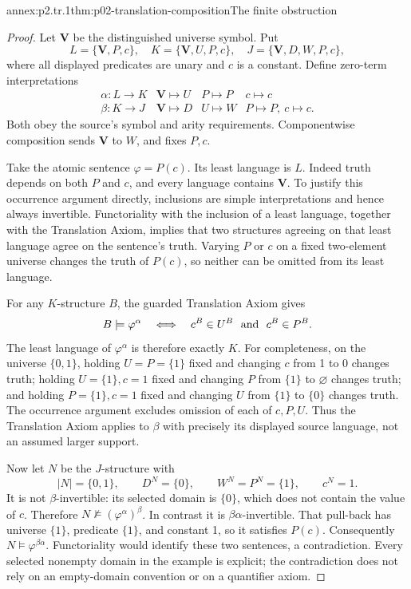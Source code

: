 \begin{annexitem}{annex:p2.tr.1}{thm:p02-translation-composition}{The finite obstruction}
\begin{proof}
Let \(\mathbf V\) be the distinguished universe symbol. Put
\[
 L=\{\mathbf V,P,c\},\quad
 K=\{\mathbf V,U,P,c\},\quad
 J=\{\mathbf V,D,W,P,c\},
\]
where all displayed predicates are unary and \(c\) is a constant.
Define zero-term interpretations
\[
 \begin{array}{c|ccc}
 \alpha:L\to K&\mathbf V\mapsto U&P\mapsto P&c\mapsto c\\
 \beta:K\to J&\mathbf V\mapsto D&U\mapsto W&P\mapsto P,\ c\mapsto c.
 \end{array}
\]
Both obey the source's symbol and arity requirements. Componentwise
composition sends \(\mathbf V\) to \(W\), and fixes \(P,c\).

Take the atomic sentence \(\varphi=P(c)\). Its least language is \(L\).
Indeed truth depends on both \(P\) and \(c\), and every language contains
\(\mathbf V\). To justify this occurrence argument directly, inclusions
are simple interpretations and hence always invertible. Functoriality
with the inclusion of a least language, together with the Translation
Axiom, implies that two structures agreeing on that least language
agree on the sentence's truth. Varying \(P\) or \(c\) on a fixed
two-element universe changes the truth of \(P(c)\), so neither can be
omitted from its least language.

For any \(K\)-structure \(B\), the guarded Translation Axiom gives
\[
 B\models\varphi^\alpha
 \quad\Longleftrightarrow\quad c^B\in U^B\ \hbox{ and }\ c^B\in P^B.
\]
The least language of \(\varphi^\alpha\) is therefore exactly \(K\).
For completeness, on the universe \(\{0,1\}\), holding
\(U=P=\{1\}\) fixed and changing \(c\) from 1 to 0 changes truth;
holding \(U=\{1\},c=1\) fixed and changing \(P\) from \(\{1\}\) to
\(\varnothing\) changes truth; and holding \(P=\{1\},c=1\) fixed
and changing \(U\) from \(\{1\}\) to \(\{0\}\) changes truth.
The occurrence argument excludes omission of each of \(c,P,U\).
Thus the Translation Axiom applies to \(\beta\) with precisely its
displayed source language, not an assumed larger support.

Now let \(N\) be the \(J\)-structure with
\[
 |N|=\{0,1\},\qquad D^N=\{0\},\qquad
 W^N=P^N=\{1\},\qquad c^N=1.
\]
It is not \(\beta\)-invertible: its selected domain is \(\{0\}\), which
does not contain the value of \(c\). Therefore
\(N\not\models(\varphi^\alpha)^\beta\).
In contrast it is \(\beta\alpha\)-invertible. That pull-back has
universe \(\{1\}\), predicate \(\{1\}\), and constant 1, so it
satisfies \(P(c)\). Consequently
\(N\models\varphi^{\beta\alpha}\). Functoriality would identify these
two sentences, a contradiction. Every selected nonempty domain in the
example is explicit; the contradiction does not rely on an empty-domain
convention or on a quantifier axiom.
\end{proof}
\end{annexitem}

